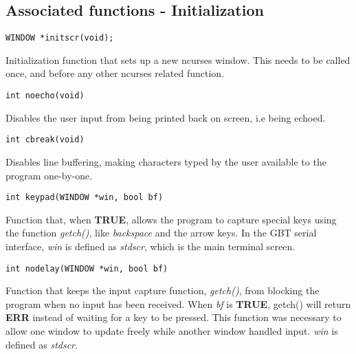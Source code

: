 \documentclass[main.tex]{subfiles}
\begin{document}
\subsection{Associated functions - Initialization}


\begin{lstlisting}[frame=single] 
WINDOW *initscr(void);
\end{lstlisting}
Initialization function that sets up a new ncurses window. This needs to be called once, and before any other ncurses related function.\\

\begin{lstlisting}[frame=single] 
int noecho(void)
\end{lstlisting}
Disables the user input from being printed back on screen, i.e being echoed.  \\

\begin{lstlisting}[frame=single] 
int cbreak(void)
\end{lstlisting}
Disables line buffering, making characters typed by the user available to the program one-by-one.\\

\begin{lstlisting}[frame=single] 
int keypad(WINDOW *win, bool bf)
\end{lstlisting}
Function that, when \textbf{TRUE}, allows the program to capture special keys using the function \textit{getch()}, like \textit{backspace} and the arrow keys. In the GBT serial interface, \textit{win} is defined as \textit{stdscr}, which is the main terminal screen. \\

\begin{lstlisting}[frame=single] 
int nodelay(WINDOW *win, bool bf)
\end{lstlisting}
Function that keeps the input capture function, \textit{getch()}, from blocking the program when no input has been received. When \textit{bf} is \textbf{TRUE}, getch() will return \textbf{ERR} instead of waiting for a key to be pressed. This function was necessary to allow one window to update freely while another window handled input. \textit{win} is defined as \textit{stdscr}.\\
\end{document}
